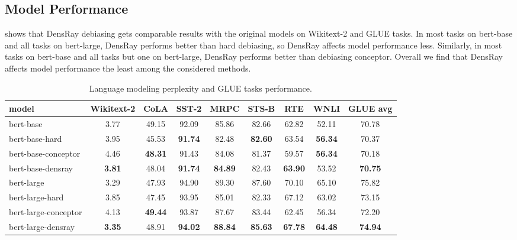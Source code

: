 \subsection{Model Performance}
 shows that DensRay debiasing gets comparable results with
the original models on Wikitext-2 and GLUE tasks.
In most tasks on bert-base and all tasks on bert-large, DensRay performs better than hard debiasing, so DensRay affects model performance less.
Similarly, in most tasks on bert-base and all tasks but one
on bert-large, DensRay performs better than debiasing conceptor. Overall we find that DensRay affects model performance the least among the considered methods.
\begin{table}[h]
\centering
\footnotesize
\vspace{0cm}  
\setlength{\abovecaptionskip}{0.2cm}   
\setlength{\belowcaptionskip}{0cm}
\begin{tabular}{l||c|cccccc|c}
model & Wikitext-2&CoLA &SST-2&MRPC&STS-B&RTE&WNLI&GLUE avg\\
\hline\hline
		bert-base &3.77&49.15&92.09&85.86&82.66&62.82&52.11&70.78\\
bert-base-hard &3.95&45.53&\textbf{91.74}&82.48&\textbf{82.60}&63.54&\textbf{56.34}&70.37\\
bert-base-conceptor &4.46&\textbf{48.31}&91.43&84.08&81.37&59.57&\textbf{56.34}&70.18\\
bert-base-densray &\textbf{3.81}&48.04&\textbf{91.74}&\textbf{84.89}&82.43&\textbf{63.90}&53.52&\textbf{70.75}\\
\hline
bert-large &3.29& 47.93&94.90&89.30&87.60&70.10&65.10&75.82\\
bert-large-hard &3.85& 47.45&93.95&85.01&82.33&67.12&63.02&73.15\\
bert-large-conceptor &4.13&\textbf{49.44}&93.87&87.67&83.44&62.45&56.34&72.20\\
bert-large-densray &\textbf{3.35}& 48.91&\textbf{94.02}&\textbf{88.84}&\textbf{85.63}&\textbf{67.78}&\textbf{64.48}&\textbf{74.94}\\
\end{tabular}
\caption{
Language modeling perplexity and GLUE tasks
performance. }
\end{table}


